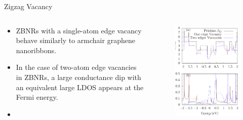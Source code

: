 \documentclass[handout,t]{beamer}
\begin{document}
\begin{frame}{Zigzag Vacancy}
	\begin{columns}[t]
		\begin{column}[t]{0.5\linewidth}
			\begin{itemize}
				\item ZBNRs with a single-atom edge vacancy behave similarly to armchair graphene nanoribbons.
				\item  In the case of two-atom edge vacancies in ZBNRs, a large conductance dip with an equivalent large LDOS appears at the Fermi energy.
				\item 
			\end{itemize}
		\end{column}
		\begin{column}[t]{0.5\linewidth}
			\begin{figure}[ht]
				\raggedleft
				\includegraphics[width=\linewidth]{../figures/zigvacancy-thesis.eps}
				\label{zigvacancy}
			\end{figure}
		\end{column}
	\end{columns}
\end{frame}
\end{document}
